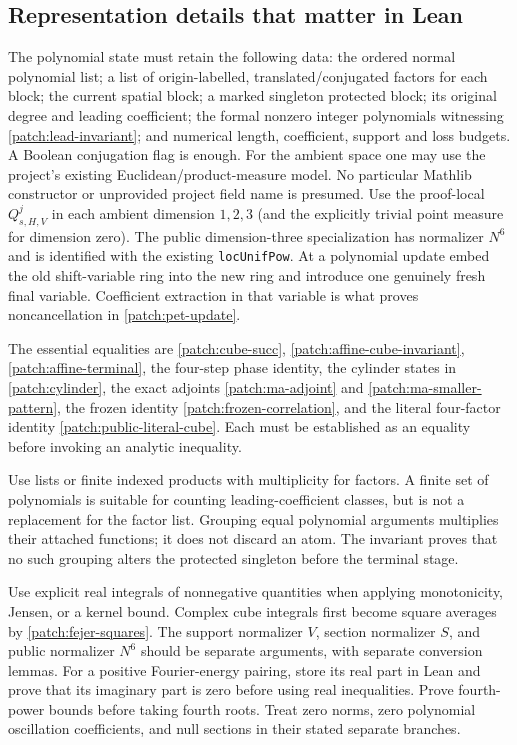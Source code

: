 \documentclass[11pt]{article}
\theoremstyle{definition}
\newcommand{\pid}[1]{\nolinkurl{#1}}
\begin{document}
\subsection{Representation details that matter in Lean}
The polynomial state must retain the following data: the ordered normal polynomial list;
a list of origin-labelled, translated/conjugated factors for each block; the current spatial
block; a marked singleton protected block; its original degree and leading coefficient;
the formal nonzero integer polynomials witnessing \eqref{patch:lead-invariant}; and numerical
length, coefficient, support and loss budgets.  A Boolean conjugation flag is enough.
For the ambient space one may use the project's existing Euclidean/product-measure model.
No particular Mathlib constructor or unprovided project field name is presumed.
Use the proof-local $Q_{s,H,V}^j$ in each ambient dimension $1,2,3$ (and the explicitly
trivial point measure for dimension zero).  The public dimension-three specialization
has normalizer $N^6$ and is identified with the existing \pid{locUnifPow}.
At a polynomial update embed the old shift-variable ring into the new ring and introduce
one genuinely fresh final variable.  Coefficient extraction in that variable is what proves
noncancellation in \cref{patch:pet-update}.

The essential equalities are \eqref{patch:cube-succ},
\eqref{patch:affine-cube-invariant},
\eqref{patch:affine-terminal}, the four-step phase identity, the cylinder states in
\cref{patch:cylinder}, the exact adjoints \eqref{patch:ma-adjoint} and
\eqref{patch:ma-smaller-pattern}, the frozen identity \eqref{patch:frozen-correlation},
and the literal four-factor identity \eqref{patch:public-literal-cube}.
Each must be established as an equality before invoking an analytic inequality.

Use lists or finite indexed products with multiplicity for factors.  A finite set of
polynomials is suitable for counting leading-coefficient classes, but is not a replacement
for the factor list.  Grouping equal polynomial arguments multiplies their attached functions;
it does not discard an atom.  The invariant proves that no such grouping alters the protected
singleton before the terminal stage.

Use explicit real integrals of nonnegative quantities when applying monotonicity, Jensen,
or a kernel bound.  Complex cube integrals first become square averages by
\cref{patch:fejer-squares}.  The support normalizer $V$, section normalizer $S$, and public
normalizer $N^6$ should be separate arguments, with separate conversion lemmas.
For a positive Fourier-energy pairing, store its real part in Lean and prove that its
imaginary part is zero before using real inequalities.  Prove fourth-power bounds before taking fourth roots.  Treat zero norms,
zero polynomial oscillation coefficients, and null sections in their stated separate branches.
\end{document}
